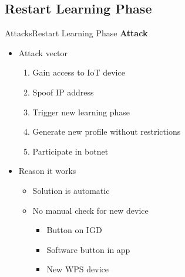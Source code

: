 \subsection{Restart Learning Phase}
\begin{frame}{Attacks}{Restart Learning Phase}
		\textbf{Attack}
		\begin{itemize}
			\item Attack vector
		\begin{enumerate}
			\item Gain access to IoT device
			\item Spoof IP address
			\item Trigger new learning phase
			\item Generate new profile without restrictions
			\item Participate in botnet
		\end{enumerate}	
		\item Reason it works
		\begin{itemize}
			\item Solution is automatic
			\item No manual check for new device
			\begin{itemize}
				\item Button on IGD
				\item Software button in app
				\item New WPS device
			\end{itemize}
		\end{itemize}
		\end{itemize}
\end{frame}

